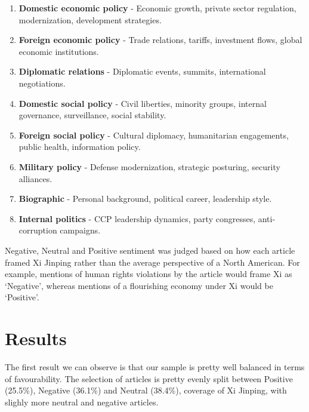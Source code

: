 \documentclass{article}
\begin{document}
      \begin{enumerate}
         \item \textbf{Domestic economic policy} - Economic growth, private sector regulation, modernization, development strategies.
         \item \textbf{Foreign economic policy} - Trade relations, tariffs, investment flows, global economic institutions.
         \item \textbf{Diplomatic relations} - Diplomatic events, summits, international negotiations.
         \item \textbf{Domestic social policy} - Civil liberties, minority groups, internal governance, surveillance, social stability.
         \item \textbf{Foreign social policy} - Cultural diplomacy, humanitarian engagements, public health, information policy.
         \item \textbf{Military policy} - Defense modernization, strategic posturing, security alliances.
         \item \textbf{Biographic} - Personal background, political career, leadership style.
         \item \textbf{Internal politics} - CCP leadership dynamics, party congresses, anti-corruption campaigns.
      \end{enumerate}
   Negative, Neutral and Positive sentiment was judged based on how each article framed Xi Jinping rather than the average perspective of a North American. For example, mentions of human rights violations by the article would frame Xi as ‘Negative’, whereas mentions of a flourishing economy under Xi would be ‘Positive’.


  
   \section{Results} %

   The first result we can observe is that our sample is pretty well balanced in terms of favourability.
   The selection of articles is pretty evenly split between Positive (25.5\%), Negative (36.1\%) and Neutral (38.4\%),
   coverage of Xi Jinping, with slighly more neutral and negative articles. 
   
\end{document}

